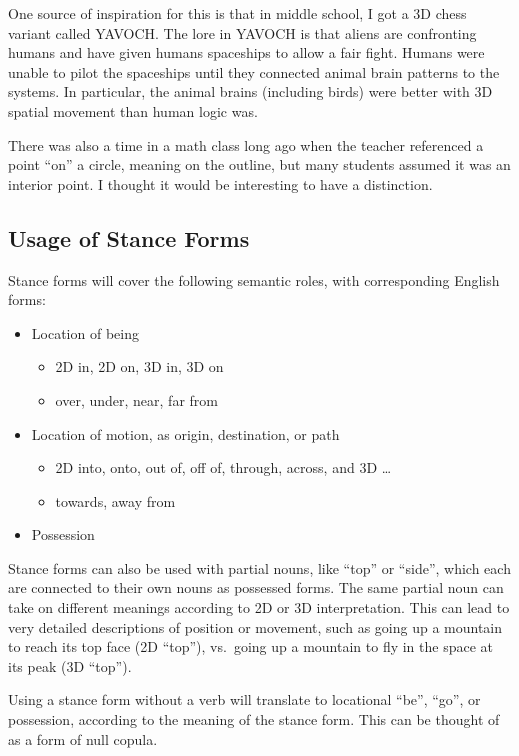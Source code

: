 One source of inspiration for this is that in middle school,
I got a 3D chess variant called YAVOCH\@.
The lore in YAVOCH is that aliens are confronting humans
and have given humans spaceships to allow a fair fight.
Humans were unable to pilot the spaceships until
they connected animal brain patterns to the systems.
In particular, the animal brains (including birds)
were better with 3D spatial movement than human logic was.

There was also a time in a math class long ago when the teacher
referenced a point ``on'' a circle, meaning on the outline,
but many students assumed it was an interior point.
I thought it would be interesting to have a distinction.

\subsection{Usage of Stance Forms}\label{subsec:usage-of-stance-forms}

Stance forms will cover the following semantic roles,
with corresponding English forms:
\begin{itemize}
    \item
    Location of being
    \begin{itemize}
        \item 2D in, 2D on, 3D in, 3D on
        \item over, under, near, far from
    \end{itemize}
    \item
    Location of motion, as origin, destination, or path
    \begin{itemize}
        \item 2D into, onto, out of, off of, through, across, and 3D \dots
        \item towards, away from
    \end{itemize}
    \item
    Possession
\end{itemize}

Stance forms can also be used with partial nouns,
like ``top'' or ``side'',
which each are connected to their own nouns as possessed forms.
The same partial noun can take on different meanings according to 2D or 3D interpretation.
This can lead to very detailed descriptions of position or movement,
such as going up a mountain to reach its top face (2D ``top''),
vs.\ going up a mountain to fly in the space at its peak (3D ``top'').

Using a stance form without a verb will translate to
locational ``be'', ``go'', or possession,
according to the meaning of the stance form.
This can be thought of as a form of null copula.

